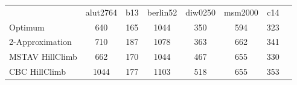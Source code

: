 \begin{tabular}[ht]{|l||c|c|c|c|c|c|H}
 & alut2764 & b13 & berlin52 & diw0250 & msm2000 & c14 & \\  
Optimum &640 & 165 & 1044 & 350 & 594 & 323 & \\ 
2-Approximation &710 & 187 & 1078 & 363 & 662 & 341 & \\ 
MSTAV HillClimb &662 & 170 & 1044 & 467 & 655 & 330 & \\ 
CBC HillClimb &1044 & 177 & 1103 & 518 & 655 & 353 & \\ 
\end{tabular}
